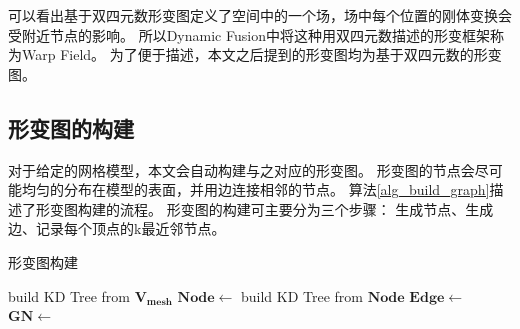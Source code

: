 可以看出基于双四元数形变图定义了空间中的一个场，场中每个位置的刚体变换会受附近节点的影响。
所以Dynamic Fusion中将这种用双四元数描述的形变框架称为Warp Field。
为了便于描述，本文之后提到的形变图均为基于双四元数的形变图。

\subsection{形变图的构建}  
对于给定的网格模型，本文会自动构建与之对应的形变图。
形变图的节点会尽可能均匀的分布在模型的表面，并用边连接相邻的节点。
算法\ref{alg_build_graph}描述了形变图构建的流程。
形变图的构建可主要分为三个步骤：
生成节点、生成边、记录每个顶点的k最近邻节点。
\begin{algorithm}
    \caption{形变图构建}
    \label{alg_build_graph}
    \begin{algorithmic}[1]
            \State build KD Tree from $\bm{V_{mesh}}$
            \State $\bm{Node} \gets$ 
            \State build KD Tree from $\bm{Node}$
            \State $\bm{Edge} \gets$ 
            \State $\bm{GN} \gets$ 
        \EndProcedure
    \end{algorithmic}
\end{algorithm} 

